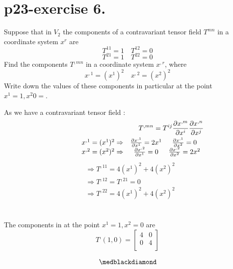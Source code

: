 \section{p23-exercise 6.}
\begin{tcolorbox}
Suppose that in $V_2$ the components of a contravariant tensor field $T^{mn}$ in a coordinate system $x^r$ are 
$$T^{11}=1 \quad T^{12}=0$$
$$T^{21}=1 \quad T^{22}=0$$
Find the components $T^{,mn}$ in a coordinate system $x^{,r}$, where
$$x^{,1} =(x^{1})^2\quad x^{,2} = (x^{2})^2$$
Write down the values of these components in particular at the point $x^1 = 1, x^2 0 =$.
\end{tcolorbox}
As we have a contravariant tensor field :
\begin{align}
\ T^{,mn} =  T^{ij}\pdv{x^{,m}}{x^{i}}\pdv{x^{,n}}{x^{j}}\\
 \begin{array}{ccc}
   \quad \quad \quad \quad  x^{,1} =(x^{1})^2  \Rightarrow & \pdv{x^{,1}}{x^{1}} = 2x^{1} & \pdv{x^{,1}}{x^{2}} = 0\\
\quad \quad \quad \quad x^{,2} =(x^{2})^2  \Rightarrow & \pdv{x^{,2}}{x^{1}} = 0 & \pdv{x^{,2}}{x^{2}} = 2x^{2}\\
  \end{array}\\
  \end{align}
  \begin{align}
  &\Rightarrow T^{,11} = 4(x^{1})^2 + 4(x^{2})^2 \\
  &\Rightarrow T^{,12} = T^{,21}=0 \\
  &\Rightarrow T^{,22} = 4(x^{1})^2 + 4(x^{2})^2
  \end{align}\\\\
  The components in  at the point $x^1 = 1, x^2 = 0$ are
  $$T^{,}(1,0) = \left[{\begin{array}{cc} 4 & 0 \\
    0 & 4 \\ 
    \end{array} } \right]$$
    
    $$\medblackdiamond$$
\pagebreak[4]

